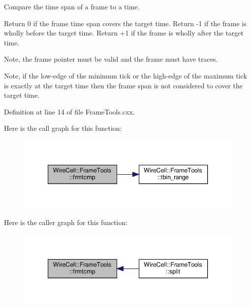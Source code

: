 Compare the time span of a frame to a time.

Return 0 if the frame time span covers the target time. Return -\/1 if the frame is wholly before the target time. Return +1 if the frame is wholly after the target time.

Note, the frame pointer must be valid and the frame must have traces.

Note, if the low-\/edge of the minimum tick or the high-\/edge of the maximum tick is exactly at the target time then the frame span is not considered to cover the target time. 

Definition at line 14 of file Frame\+Tools.\+cxx.

Here is the call graph for this function\+:
\nopagebreak
\begin{figure}[H]
\begin{center}
\leavevmode
\includegraphics[width=340pt]{namespace_wire_cell_1_1_frame_tools_a21c3c601b6103fa7a63d9131b81dc229_cgraph}
\end{center}
\end{figure}
Here is the caller graph for this function\+:
\nopagebreak
\begin{figure}[H]
\begin{center}
\leavevmode
\includegraphics[width=340pt]{namespace_wire_cell_1_1_frame_tools_a21c3c601b6103fa7a63d9131b81dc229_icgraph}
\end{center}
\end{figure}
\mbox{\label{namespace_wire_cell_1_1_frame_tools_a23aeb7045b99ef40f3c5ca79549e4f8f}} 
